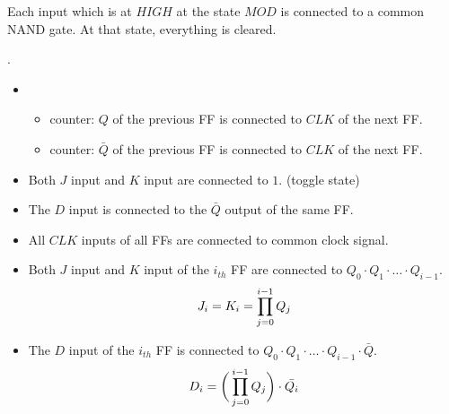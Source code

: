   \par Each input which is at $HIGH$ at the state $MOD$ is connected to a
  common NAND gate. At that state, everything is cleared.

  \par {}.




    \begin{itemize}
      \item {}
        \begin{itemize}
          \item {} counter: $Q$ of the previous FF is connected to
            $CLK$ of the next FF.
          \item {} counter: $\bar{Q}$ of the previous FF is connected to
              $CLK$ of the next FF.
        \end{itemize}
      \item {}
        \par Both $J$ input and $K$ input are connected to $1$. (toggle state)
      \item {}
        \par The $D$ input is connected to the $\bar{Q}$ output of the same FF.
    \end{itemize}
    
    \begin{itemize}
      \item {}
        \par All $CLK$ inputs of all FFs are connected to  common
          clock signal.
      \item {}
        \par Both $J$ input and $K$ input of the $i_{th}$ FF are connected to
          $Q_{0} \cdot Q_{1} \cdot \ldots \cdot Q_{i - 1}$.
          \begin{equation}
            J_{i} = K_{i} = \prod\limits _{j = 0}^{i - 1} Q_{j}
          \end{equation}
      \item {}
        \par The $D$ input of the $i_{th}$ FF is connected to
          $Q_{0} \cdot Q_{1} \cdot \ldots \cdot Q_{i - 1} \cdot \bar{Q}$.
          \begin{equation}
            D_{i} = \bigg( \prod\limits _{j = 0}^{i - 1} Q_{j} \bigg) \cdot \bar{Q_{i}}
          \end{equation}
    \end{itemize}
